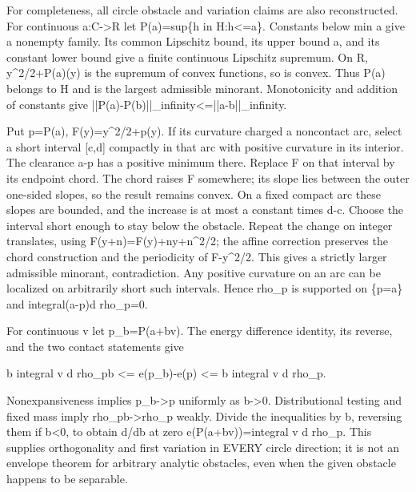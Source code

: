 \documentclass[11pt]{article}
\begin{document}
For completeness, all circle obstacle and variation claims are also reconstructed. For continuous a:C->R let P(a)=sup\{h in H:h<=a\}. Constants below min a give a nonempty family. Its common Lipschitz bound, its upper bound a, and its constant lower bound give a finite continuous Lipschitz supremum. On R, y\textasciicircum{}2/2+P(a)(y) is the supremum of convex functions, so is convex. Thus P(a) belongs to H and is the largest admissible minorant. Monotonicity and addition of constants give ||P(a)-P(b)||\_infinity<=||a-b||\_infinity.

Put p=P(a), F(y)=y\textasciicircum{}2/2+p(y). If its curvature charged a noncontact arc, select a short interval [c,d] compactly in that arc with positive curvature in its interior. The clearance a-p has a positive minimum there. Replace F on that interval by its endpoint chord. The chord raises F somewhere; its slope lies between the outer one-sided slopes, so the result remains convex. On a fixed compact arc these slopes are bounded, and the increase is at most a constant times d-c. Choose the interval short enough to stay below the obstacle. Repeat the change on integer translates, using F(y+n)=F(y)+ny+n\textasciicircum{}2/2; the affine correction preserves the chord construction and the periodicity of F-y\textasciicircum{}2/2. This gives a strictly larger admissible minorant, contradiction. Any positive curvature on an arc can be localized on arbitrarily short such intervals. Hence rho\_p is supported on \{p=a\} and integral(a-p)d rho\_p=0.

For continuous v let p\_b=P(a+bv). The energy difference identity, its reverse, and the two contact statements give

b integral v d rho\_pb <= e(p\_b)-e(p) <= b integral v d rho\_p.

Nonexpansiveness implies p\_b->p uniformly as b->0. Distributional testing and fixed mass imply rho\_pb->rho\_p weakly. Divide the inequalities by b, reversing them if b<0, to obtain d/db at zero e(P(a+bv))=integral v d rho\_p. This supplies orthogonality and first variation in EVERY circle direction; it is not an envelope theorem for arbitrary analytic obstacles, even when the given obstacle happens to be separable.
\end{document}
